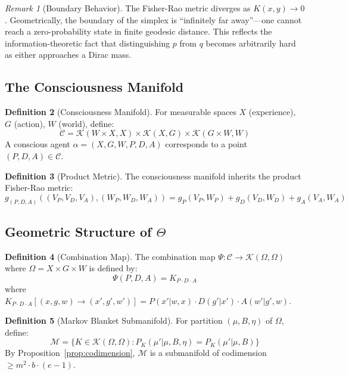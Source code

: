 \documentclass[11pt,a4paper]{article}
\theoremstyle{definition}
\newtheorem{definition}{Definition}[section]
\theoremstyle{plain}
\theoremstyle{remark}
\newtheorem{remark}[definition]{Remark}
\begin{document}
\begin{remark}[Boundary Behavior]
The Fisher-Rao metric diverges as $K(x,y) \to 0$. Geometrically, the boundary of the simplex is ``infinitely far away''---one cannot reach a zero-probability state in finite geodesic distance. This reflects the information-theoretic fact that distinguishing $p$ from $q$ becomes arbitrarily hard as either approaches a Dirac mass.
\end{remark}

\subsection{The Consciousness Manifold}

\begin{definition}[Consciousness Manifold]\label{def:consciousness-manifold}
For measurable spaces $X$ (experience), $G$ (action), $W$ (world), define:
\[
\mathcal{C} = \mathcal{K}(W \times X, X) \times \mathcal{K}(X, G) \times \mathcal{K}(G \times W, W)
\]
A conscious agent $\alpha = (X, G, W, P, D, A)$ corresponds to a point $(P, D, A) \in \mathcal{C}$.
\end{definition}

\begin{definition}[Product Metric]
The consciousness manifold inherits the product Fisher-Rao metric:
\[
g_{(P,D,A)}((V_P, V_D, V_A), (W_P, W_D, W_A)) = g_P(V_P, W_P) + g_D(V_D, W_D) + g_A(V_A, W_A)
\]
\end{definition}

\subsection{Geometric Structure of $\Theta$}

\begin{definition}[Combination Map]
The combination map $\Psi: \mathcal{C} \to \mathcal{K}(\Omega, \Omega)$ where $\Omega = X \times G \times W$ is defined by:
\[
\Psi(P, D, A) = K_{P \cdot D \cdot A}
\]
where $K_{P \cdot D \cdot A}[(x,g,w) \to (x',g',w')] = P(x'|w,x) \cdot D(g'|x') \cdot A(w'|g',w)$.
\end{definition}

\begin{definition}[Markov Blanket Submanifold]
For partition $(\mu, B, \eta)$ of $\Omega$, define:
\[
\mathcal{M} = \{ K \in \mathcal{K}(\Omega, \Omega) : P_K(\mu' | \mu, B, \eta) = P_K(\mu' | \mu, B) \}
\]
By Proposition~\ref{prop:codimension}, $\mathcal{M}$ is a submanifold of codimension $\geq m^2 \cdot b \cdot (e-1)$.
\end{definition}
\end{document}
